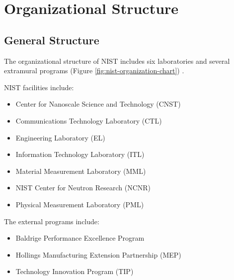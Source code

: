 \section{Organizational Structure}

\subsection{General Structure}

The organizational structure of NIST includes six laboratories and several extramural programs (Figure \ref{fig:nist-organization-chart}) \cite{nist2016organization}.

NIST facilities include:

\begin{itemize}
    \item Center for Nanoscale Science and Technology (CNST)
    \item Communications Technology Laboratory (CTL)
    \item Engineering Laboratory (EL)
    \item Information Technology Laboratory (ITL)
    \item Material Measurement Laboratory (MML)
    \item NIST Center for Neutron Research (NCNR)
    \item Physical Measurement Laboratory (PML)
\end{itemize}

The external programs include:

\begin{itemize}
    \item Baldrige Performance Excellence Program
    \item Hollings Manufacturing Extension Partnership (MEP)
    \item Technology Innovation Program (TIP)
\end{itemize}

